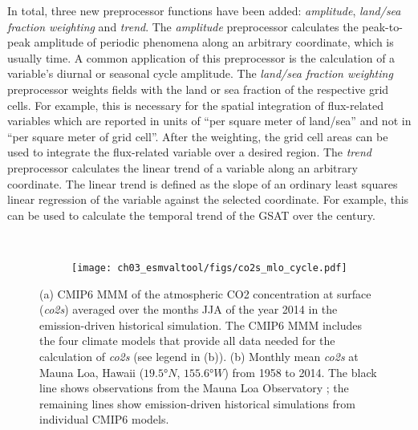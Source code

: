In total, three new preprocessor functions have been added: \emph{amplitude},
\emph{land/sea fraction weighting} and \emph{trend}. The \emph{amplitude}
preprocessor calculates the peak-to-peak amplitude of periodic phenomena along
an arbitrary coordinate, which is usually time. A common application of this
preprocessor is the calculation of a variable's diurnal or seasonal cycle
amplitude. The \emph{land/sea fraction weighting} preprocessor weights fields
with the land or sea fraction of the respective grid cells. For example, this
is necessary for the spatial integration of flux-related variables which are
reported in units of \enquote{per square meter of land/sea} and not in
\enquote{per square meter of grid cell}. After the weighting, the grid cell
areas can be used to integrate the flux-related variable over a desired region.
The \emph{trend} preprocessor calculates the linear trend of a variable along
an arbitrary coordinate. The linear trend is defined as the slope of an
ordinary least squares linear regression of the variable against the selected
coordinate. For example, this can be used to calculate the temporal trend of
the \ac{GSAT} over the  century.

\begin{figure}[t]
  \centering
  \begin{subfigure}[b]{\SubfigureWidth{}}
    \caption{}
    \label{fig:03:co2s:a}
  \end{subfigure}
  ~
  \begin{subfigure}[b]{\SubfigureWidth{}}
    \texttt{[image: 
      ch03\_esmvaltool/figs/co2s\_mlo\_cycle.pdf]}
    \caption{}
    \label{fig:03:co2s:b}
  \end{subfigure}
  \caption{(a) \acs{CMIP}6 \acf{MMM} of the atmospheric \acs{CO2} concentration
    at surface (\emph{co2s}) averaged over the months \acf{JJA} of the year
    2014 in the emission-driven historical simulation. The \acs{CMIP}6
    \acs{MMM} includes the four climate models that provide all data needed
    for the calculation of \emph{co2s} (see legend in (b)). (b) Monthly mean
    \emph{co2s} at Mauna Loa, Hawaii ($19.5 \unit{\degree N}$, $155.6
    \unit{\degree W}$) from 1958 to 2014. The black line shows observations
    from the Mauna Loa Observatory \autocite{Keeling2005}; the remaining lines
    show emission-driven historical simulations from individual \acs{CMIP}6
    models.}
  \label{fig:03:co2s}
\end{figure}

